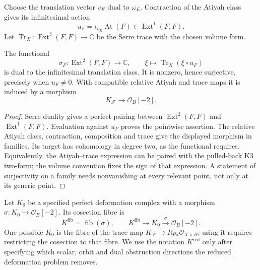 Choose the translation vector \(v_E\) dual to \(\omega_E\).  Contraction
of the Atiyah class gives its infinitesimal action
\[
 u_F=\iota_{v_E}\operatorname{At}(F)\in\operatorname{Ext}^1(F,F).
\]
Let \(\operatorname{Tr}_X:\operatorname{Ext}^3(F,F)\to\mathbb C\)
be the Serre trace with the chosen volume form.

\begin{proposition}
\label{prop:k3-semiregularity-cosection}
\label{prop:k3-cosection-surjectivity-criterion}
The functional
\[
 \sigma_F:\operatorname{Ext}^2(F,F)\longrightarrow\mathbb C,
 \qquad \xi\longmapsto\operatorname{Tr}_X(\xi\circ u_F)
\]
is dual to the infinitesimal translation class.  It is nonzero, hence
surjective, precisely when \(u_F\ne0\).  With compatible relative Atiyah
and trace maps it is induced by a morphism
\[
 K_{\mathcal F}\longrightarrow\mathcal O_B[-2].
\]
\end{proposition}
\begin{proof}
Serre duality gives a perfect pairing between
\(\operatorname{Ext}^2(F,F)\) and \(\operatorname{Ext}^1(F,F)\).
Evaluation against \(u_F\) proves the pointwise assertion.  The relative
Atiyah class, contraction, composition and trace give the displayed
morphism in families.  Its target has cohomology in degree two, as the
functional requires.  Equivalently, the Atiyah--trace expression can be
paired with the pulled-back K3 two-form; the volume convention fixes the
sign of that expression.  A statement of surjectivity on a family needs
nonvanishing at every relevant point, not only at its generic point.
\end{proof}

\begin{definition}
\label{def:rhom-red-self-ext-cone}
Let \(K_0\) be a specified perfect deformation complex with a morphism
\(\sigma:K_0\to\mathcal O_B[-2]\).  Its cosection fibre is
\[
 K^{\mathrm{fib}}=\operatorname{fib}(\sigma),\qquad
 K^{\mathrm{fib}}\longrightarrow K_0
 \xrightarrow{\sigma}\mathcal O_B[-2].
\]
One possible \(K_0\) is the fibre of the trace map
\(K_{\mathcal F}\to Rp_*\mathcal O_{X\times B}\); using it requires
restricting the cosection to that fibre.  We use the notation
\(K^{\mathrm{red}}\) only after specifying which scalar, orbit and dual
obstruction directions the reduced deformation problem removes.
\end{definition}

